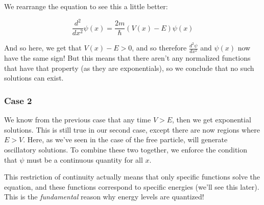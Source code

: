 We rearrange the \schrodinger equation to see this a little better: 

\[ \frac{d^2}{dx^2} \psi(x) = \frac{2m}{\hbar} \left(V(x) - E\right) \psi(x)\] 

And so here, we get that $V(x) - E > 0$, and so therefore $\frac{d^2\psi}{dx^2}$ and $\psi(x)$ now have the same sign! But this means that there aren't any normalized functions that have that property (as they are exponentials), so we conclude that no such solutions can exist.

\subsubsection*{Case 2}

We know from the previous case that any time $V > E$, then we get exponential solutions. This is still true in our second case, except there are now regions where $E > V$. Here, as we've seen in the case of the free particle, will generate oscillatory solutions. To combine these two together, we enforce the condition that $\psi$ must be a continuous quantity for all $x$. 

\begin{insight*}{}{}
    This restriction of continuity actually means that only specific functions solve the \schrodinger equation, and these functions correspond to specific energies (we'll see this later). This is the \textit{fundamental} reason why energy levels are quantized!
\end{insight*}